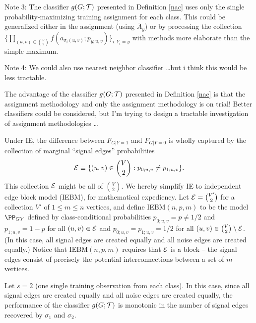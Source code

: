 Note 3:
The classifier $g(G;\mathcal{T})$ presented in Definition \ref{nac}
uses only the single probability-maximizing training assignment for each class.
This could be generalized either in the assignment (using $\overline{A}_y$)
or by processing the collection
$\{\prod_{(u,v) \in {V \choose 2}} f(a_{\sigma_i(u,v)};p_{y;u,v})\}_{i:Y_i=y}$
with methods more elaborate than the simple maximum.

Note 4:
We could also use nearest neighbor classifier \dots but i think this would be less tractable.

The advantage of the classifier $g(G;\mathcal{T})$ presented in Definition \ref{nac}
is that the assignment methodology and only the assignment methodology is on trial!
Better classifiers could be considered,
but I'm trying to design a tractable investigation of assignment methodologies \dots


Under IE,
the difference between
$F_{G|Y=1}$ and $F_{G|Y=0}$
is wholly captured by the collection of marginal ``signal edges'' probabilities
$$\mathcal{E} \equiv \{(u,v) \in {V \choose 2}: p_{0;u,v} \neq p_{1;u,v}\}.$$
This collection $\mathcal{E}$ might be all of ${V \choose 2}$.
We hereby simplify IE to independent edge block model (IEBM), for mathematical expediency.
Let $\mathcal{E} = {V' \choose 2}$ for a collection $V'$ of $1 \leq m \leq n$ vertices,
and define
IEBM$(n,p,m)$ to be the model $\PP_{GY}$ defined by class-conditional probabilities
$p_{0;u,v}=p \neq 1/2$ and $p_{1;u,v}=1-p$ for all $(u,v) \in \mathcal{E}$
and $p_{0;u,v}=p_{1;u,v}=1/2$ for all $(u,v) \in {V \choose 2} \setminus \mathcal{E}$.
(In this case, all signal edges are created equally and all noise edges are created equally.)
Notice that
IEBM$(n,p,m)$ requires that $\mathcal{E}$ is a block --
the signal edges consist of precisely the potential interconnections between a set of $m$ vertices.


Let $s=2$ (one single training observation from each class).
In this case, since all signal edges are created equally and all noise edges are created equally,
the performance of the classifier $g(G;\mathcal{T})$
is monotonic in the number of signal edges recovered by $\sigma_1$ and $\sigma_2$.


